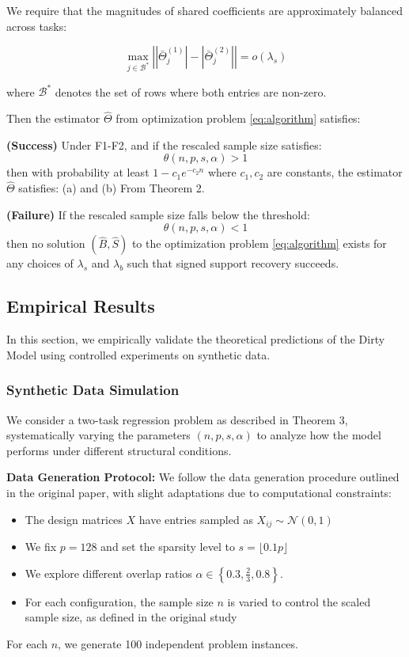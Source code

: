 \documentclass{article}
\begin{document}
We require that the magnitudes of shared coefficients are approximately balanced across tasks:




$$\max_{j \in \mathcal{B}^*} \left| |\bar{\Theta}^{(1)}_j| - |\bar{\Theta}^{(2)}_j| \right| = o(\lambda_s)$$

where $\mathcal{B}^*$ denotes the set of rows where both entries are non-zero.

Then the estimator $\widehat{\Theta}$ from optimization problem \eqref{eq:algorithm} satisfies:

\textbf{(Success)}
Under F1-F2, and if the rescaled sample size satisfies:
$$\theta(n, p, s, \alpha) > 1$$
then with probability at least $1 - c_1 e^{-c_2 n}$ where $c_1, c_2$ are constants, the estimator $\widehat{\Theta}$ satisfies: (a) and (b) From Theorem 2.

\textbf{(Failure)}
If the rescaled sample size falls below the threshold:
$$\theta(n, p, s, \alpha) < 1$$
then no solution $(\widehat{B}, \widehat{S})$ to the optimization problem \eqref{eq:algorithm} exists for any choices of $\lambda_s$ and $\lambda_b$ such that signed support recovery succeeds.

\subsection{Empirical Results}
In this section, we empirically validate the theoretical predictions of the Dirty Model using controlled experiments on synthetic data.

\subsubsection{Synthetic Data Simulation}
We consider a two-task regression problem as described in Theorem 3, systematically varying the parameters $(n, p, s, \alpha)$ to analyze how the model performs under different structural conditions.

\textbf{Data Generation Protocol:}
We follow the data generation procedure outlined in the original paper, with slight adaptations due to computational constraints:
\begin{itemize}
    \item The design matrices $X$ have entries sampled as $X_{ij} \sim \mathcal{N}(0, 1)$
    \item We fix $p = 128$ and set the sparsity level to $s = \lfloor 0.1p \rfloor$
    \item We explore different overlap ratios $\alpha \in \left\{0.3, \frac{2}{3}, 0.8\right\}$.
    \item For each configuration, the sample size $n$ is varied to control the scaled sample size, as defined in the original study
\end{itemize}
For each $n$, we generate 100 independent problem instances.
\end{document}
